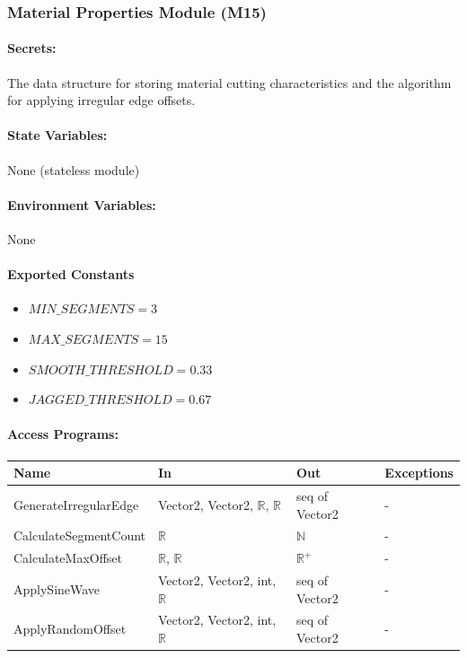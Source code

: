 \documentclass[12pt, titlepage]{article}
\begin{document}
\vspace{10mm}

\subsubsection{Material Properties Module (M15)} \label{M15}

\paragraph{Secrets:}
The data structure for storing material cutting characteristics and the algorithm for applying irregular edge offsets.

\paragraph{State Variables:}
None (stateless module)

\paragraph{Environment Variables:}
None

\paragraph{Exported Constants}
\begin{itemize}
\item $MIN\_SEGMENTS = 3$
\item $MAX\_SEGMENTS = 15$
\item $SMOOTH\_THRESHOLD = 0.33$
\item $JAGGED\_THRESHOLD = 0.67$
\end{itemize}

\paragraph{Access Programs:}

\begin{center}
\begin{tabular}{p{42mm}p{45mm}p{26mm}p{23mm}}
\toprule
\textbf{Name} & \textbf{In} & \textbf{Out} & \textbf{Exceptions} \\
\midrule
GenerateIrregularEdge & Vector2, Vector2, $\mathbb{R}$, $\mathbb{R}$ & seq of Vector2 & - \\
CalculateSegmentCount & $\mathbb{R}$ & $\mathbb{N}$ & - \\
CalculateMaxOffset & $\mathbb{R}$, $\mathbb{R}$ & $\mathbb{R}^+$ & - \\
ApplySineWave & Vector2, Vector2, int, $\mathbb{R}$ & seq of Vector2 & - \\
ApplyRandomOffset & Vector2, Vector2, int, $\mathbb{R}$ & seq of Vector2 & - \\
\bottomrule
\end{tabular}
\end{center}
\end{document}
